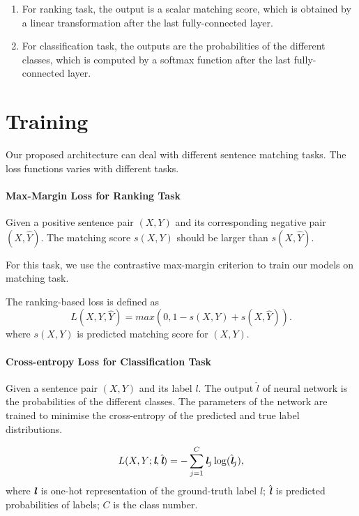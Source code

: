 \documentclass{article}
\begin{document}
\begin{enumerate}
  \item For ranking task, the output is a scalar matching score, which is obtained by a linear transformation after the last fully-connected layer.
  \item For classification task, the outputs are the probabilities of the different classes, which is computed by a softmax function after the last fully-connected layer.
\end{enumerate}


\section{Training}

Our proposed architecture can deal with different sentence matching tasks.  The loss functions varies with different tasks.


\paragraph{Max-Margin Loss for Ranking Task}
Given a positive sentence pair $(X,Y)$ and its corresponding negative pair $(X,\hat{Y})$. The matching score $s(X,Y)$ should be larger than $s(X,\hat{Y})$.

For this task, we use the contrastive max-margin criterion \cite{Bordes:2013,socher2013reasoning} to train our models on matching task.

The ranking-based loss is defined as
\begin{equation}
L(X,Y,\hat{Y})=max(0, 1 - s(X,Y) + s(X,\hat{Y})).
\end{equation}
where $s(X,Y)$ is predicted matching score for $(X,Y)$.

\paragraph{Cross-entropy Loss for Classification Task}

 Given a sentence pair $(X,Y)$ and its label $l$. The output $\hat{l}$ of neural network is the probabilities of the different classes. The parameters of the network are trained to minimise the cross-entropy of the predicted and true label distributions.

\begin{equation}
  L(X,Y; \emph{\textbf{l}}, \hat{\emph{\textbf{l}}}) = - \sum_{j=1}^C  \emph{\textbf{l}}_j \log(\hat{\emph{\textbf{l}}}_j),
\end{equation}
where $\emph{\textbf{l}}$ is one-hot representation of the ground-truth label $l$; ${\hat{\emph{\textbf{l}}}}$ is predicted probabilities of labels; $C$ is the class number.
\end{document}
